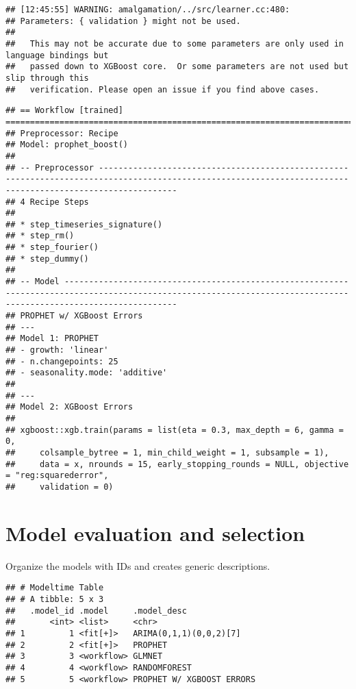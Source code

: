 \documentclass[
]{article}
\begin{document}
\begin{verbatim}
## [12:45:55] WARNING: amalgamation/../src/learner.cc:480: 
## Parameters: { validation } might not be used.
## 
##   This may not be accurate due to some parameters are only used in language bindings but
##   passed down to XGBoost core.  Or some parameters are not used but slip through this
##   verification. Please open an issue if you find above cases.
\end{verbatim}

\begin{verbatim}
## == Workflow [trained] ======================================================================================================================================================
## Preprocessor: Recipe
## Model: prophet_boost()
## 
## -- Preprocessor ------------------------------------------------------------------------------------------------------------------------------------------------------------
## 4 Recipe Steps
## 
## * step_timeseries_signature()
## * step_rm()
## * step_fourier()
## * step_dummy()
## 
## -- Model -------------------------------------------------------------------------------------------------------------------------------------------------------------------
## PROPHET w/ XGBoost Errors
## ---
## Model 1: PROPHET
## - growth: 'linear'
## - n.changepoints: 25
## - seasonality.mode: 'additive'
## 
## ---
## Model 2: XGBoost Errors
## 
## xgboost::xgb.train(params = list(eta = 0.3, max_depth = 6, gamma = 0, 
##     colsample_bytree = 1, min_child_weight = 1, subsample = 1), 
##     data = x, nrounds = 15, early_stopping_rounds = NULL, objective = "reg:squarederror", 
##     validation = 0)
\end{verbatim}

\hypertarget{model-evaluation-and-selection-1}{%
\section{Model evaluation and
selection}\label{model-evaluation-and-selection-1}}

Organize the models with IDs and creates generic descriptions.

\begin{verbatim}
## # Modeltime Table
## # A tibble: 5 x 3
##   .model_id .model     .model_desc              
##       <int> <list>     <chr>                    
## 1         1 <fit[+]>   ARIMA(0,1,1)(0,0,2)[7]   
## 2         2 <fit[+]>   PROPHET                  
## 3         3 <workflow> GLMNET                   
## 4         4 <workflow> RANDOMFOREST             
## 5         5 <workflow> PROPHET W/ XGBOOST ERRORS
\end{verbatim}
\end{document}
